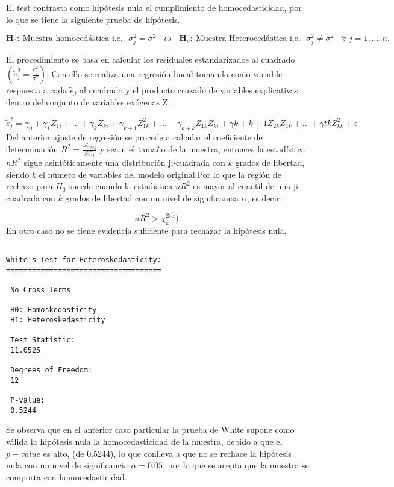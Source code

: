 \documentclass[
  a4paper,
  oneside,
  openany]{book}
\begin{document}
El test contrasta como hipótesis nula el cumplimiento de homocedasticidad, por lo que se tiene la siguiente prueba de hipótesis.

\[\textbf{H}_0: \  \mbox{Muestra homocedástica  i.e.}  \ \ \  \sigma^2_{j}=\sigma^2 \ \ \ \ vs  \ \ \ \
\textbf{H}_a: \  \mbox{Muestra Heterocedástica i.e.}  \ \ \  \sigma^2_{j} \neq \sigma^2  \ \ \ \ \forall  \ j = 1,\ldots,n.\]

El procedimiento se basa en calcular los residuales estandarizados al cuadrado \(\left( \tilde{e}^2_{j}=\frac{e^2_{j}}{\sigma^2}\right)\); Con ello se realiza una regresión lineal tomando como variable respuesta a cada \(\tilde{e}_{j}\) al cuadrado y el producto cruzado de variables explicativas dentro del conjunto de variables exógenas Z:

\[\tilde{e}_{j}^{2}=\gamma_{0}+\gamma_{1}Z_{1i}+ \ldots + \gamma_{k}Z_{ki}+\gamma_{k+1}Z^2_{1k}+\ldots + \gamma_{k+k}Z_{1k}Z_{ki}+\gamma{k+k+1}Z_{2k}Z_{1k}+\ldots + \gamma{tk}Z^2_{kk}+\epsilon\]
Del anterior ajuste de regresión se procede a calcular el coeficiente de determinación \(R^2=\frac{SC_{reg}}{SC_{T}}\) y sea n el tamaño de la muestra, entonces la estadística \(nR^2\) sigue asintóticamente una distribución ji-cuadrada con \(k\) grados de libertad, siendo \(k\) el número de variables del modelo original.Por lo que la región de rechazo para \(H_0\) sucede cuando la estadística \(nR^2\) es mayor al cuantil de una ji-cuadrada con \(k\) grados de libertad con un nivel de significancia \(\alpha\), es decir:

\[nR^2>\chi^{2(\alpha}_{k}).\]
En otro caso no se tiene evidencia suficiente para rechazar la hipótesis nula.

\begin{verbatim}

White's Test for Heteroskedasticity:
==================================== 

 No Cross Terms

 H0: Homoskedasticity
 H1: Heteroskedasticity

 Test Statistic:
 11.0525 

 Degrees of Freedom:
 12 

 P-value:
 0.5244 
\end{verbatim}

Se observa que en el anterior caso particular la prueba de White supone como válida la hipótesis nula la homocedasticidad de la muestra, debido a que el \(p-value\) es alto, (de 0.5244), lo que conlleva a que no se rechace la hipótesis nula con un nivel de significancia \(\alpha=0.05\), por lo que se acepta que la muestra se comporta con homocedasticidad.
\end{document}
